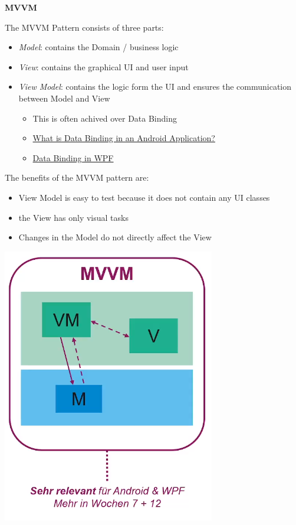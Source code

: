\documentclass[11pt,twoside,landscape]{article}
\begin{document}
\begin{multicols}{3}
\textbf{MVVM}

The MVVM Pattern consists of three parts:
\begin{itemize}
\item \emph{Model}: contains the Domain / business logic
\item \emph{View}: contains the graphical UI and user input
\item \emph{View Model}: contains the logic form the UI and ensures the communication between Model and View
\begin{itemize}
\item This is often achived over Data Binding
\item \href{../../../roam/20211112100504-what_is_data_binding_in_an_android_application.org}{What is Data Binding in an Android Application?}
\item \href{../../../roam/20211207163530-data_binding_in_wpf.org}{Data Binding in WPF}
\end{itemize}
\end{itemize}


The benefits of the MVVM pattern are:
\begin{itemize}
\item View Model is easy to test because it does not contain any UI classes
\item the View has only visual tasks
\item Changes in the Model do not directly affect the View
\end{itemize}

\begin{center}
\includegraphics[width=.9\linewidth]{img/mvvm.png}
\end{center}



\end{multicols}
\end{document}
